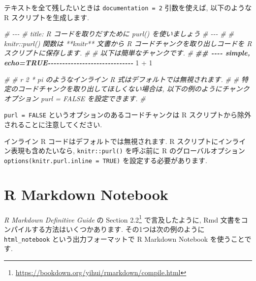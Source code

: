 \documentclass[
  11pt,
  lualatex,
  ja=standard]{bxjsreport}
\newenvironment{Shaded}{\begin{snugshade}}{\end{snugshade}}
\newcommand{\CommentTok}[1]{\textcolor[rgb]{0.56,0.35,0.01}{\textit{#1}}}
\newcommand{\DecValTok}[1]{\textcolor[rgb]{0.00,0.00,0.81}{#1}}
\newcommand{\DocumentationTok}[1]{\textcolor[rgb]{0.56,0.35,0.01}{\textbf{\textit{#1}}}}
\newcommand{\SpecialCharTok}[1]{\textcolor[rgb]{0.00,0.00,0.00}{#1}}
\renewcommand{\href}[2]{#2\footnote{\url{#1}}}
\begin{document}
テキストを全て残したいときは \texttt{documentation = 2} 引数を使えば, 以下のような R スクリプトを生成します.

\begin{Shaded}
\begin{Highlighting}[]
\CommentTok{\#\textquotesingle{} {-}{-}{-}}
\CommentTok{\#\textquotesingle{} title: R コードを取りだすために \textasciigrave{}purl()\textasciigrave{} を使いましょう}
\CommentTok{\#\textquotesingle{} {-}{-}{-}}
\CommentTok{\#\textquotesingle{} }
\CommentTok{\#\textquotesingle{} \textasciigrave{}knitr::purl()\textasciigrave{} 関数は **knitr** 文書から  R コードチャンクを取り出しコードを R スクリプトに保存します.}
\CommentTok{\#\textquotesingle{} }
\CommentTok{\#\textquotesingle{} 以下は簡単なチャンクです.}
\CommentTok{\#\textquotesingle{} }
\DocumentationTok{\#\# {-}{-}{-}{-} simple, echo=TRUE{-}{-}{-}{-}{-}{-}{-}{-}{-}{-}{-}{-}{-}{-}{-}{-}{-}{-}{-}{-}{-}{-}{-}{-}{-}{-}{-}{-}{-}{-}}
\DecValTok{1} \SpecialCharTok{+} \DecValTok{1}

\CommentTok{\#\textquotesingle{} }
\CommentTok{\#\textquotesingle{} \textasciigrave{}r 2 * pi\textasciigrave{} のようなインライン R 式はデフォルトでは無視されます.}
\CommentTok{\#\textquotesingle{} }
\CommentTok{\#\textquotesingle{} 特定のコードチャンクを取り出してほしくない場合は, 以下の例のようにチャンクオプション \textasciigrave{}purl = FALSE\textasciigrave{} を設定できます. }
\CommentTok{\#\textquotesingle{} }
\end{Highlighting}
\end{Shaded}

\texttt{purl = FALSE} というオプションのあるコードチャンクは R スクリプトから除外されることに注意してください.

インライン R コードはデフォルトでは無視されます. R スクリプトにインライン表現も含めたいなら, \texttt{knitr::purl()} を呼ぶ前に R のグローバルオプション \texttt{options(knitr.purl.inline = TRUE)} を設定する必要があります.

\hypertarget{notebook}{%
\section{R Markdown Notebook}\label{notebook}}

\emph{R Markdown Definitive Guide} \autocite{rmarkdown2018} の \href{https://bookdown.org/yihui/rmarkdown/compile.html}{Section 2.2} で言及したように, Rmd 文書をコンパイルする方法はいくつかあります. その1つは次の例のように \texttt{html\_notebook} という出力フォーマットで R Markdown Notebook を使うことです.
\end{document}
